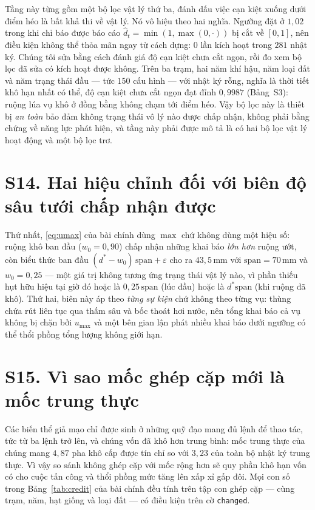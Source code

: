 Tầng này từng gồm một bộ lọc vật lý thứ ba, đánh dấu việc cạn kiệt xuống dưới điểm héo là
bất khả thi về vật lý. Nó vô hiệu theo hai nghĩa. Ngưỡng đặt ở $1{,}02$ trong khi chỉ báo
được báo cáo $\hat d_t=\min(1,\max(0,\cdot))$ bị cắt về $[0,1]$, nên điều kiện không thể
thỏa mãn ngay từ cách dựng: $0$ lần kích hoạt trong $281$ nhật ký. Chúng tôi sửa bằng cách
đánh giá độ cạn kiệt chưa cắt ngọn, rồi đo xem bộ lọc đã sửa có kích hoạt được không. Trên
ba trạm, hai năm khí hậu, năm loại đất và năm trạng thái đầu --- tức $150$ cấu hình --- với
nhật ký rỗng, nghĩa là thời tiết khô hạn nhất có thể, độ cạn kiệt chưa cắt ngọn đạt đỉnh
$0{,}9987$ (Bảng~S3): ruộng lúa vụ khô ở đồng bằng không chạm tới điểm héo. Vậy bộ lọc này
là thiết bị \emph{an toàn} bảo đảm không trạng thái vô lý nào được chấp nhận, không phải
bằng chứng về năng lực phát hiện, và tầng này phải được mô tả là có hai bộ lọc vật lý hoạt
động và một bộ lọc trơ.

\section*{S14. Hai hiệu chỉnh đối với biên độ sâu tưới chấp nhận được}

Thứ nhất, \eqref{eq:umax} của bài chính dùng $\max$ chứ không dùng một hiệu số: ruộng khô ban
đầu ($w_0=0{,}90$) chấp nhận những khai báo \emph{lớn hơn} ruộng ướt, còn biểu thức ban đầu
$(d^{*}-w_0)\,\mathrm{span}+\varepsilon$ cho ra $43{,}5$\,mm với $\mathrm{span}=70$\,mm và
$w_0=0{,}25$ --- một giá trị không tương ứng trạng thái vật lý nào, vì phần thiếu hụt hữu hiệu
tại giờ đó hoặc là $0{,}25\,\mathrm{span}$ (lúc đầu) hoặc là $d^{*}\mathrm{span}$ (khi ruộng đã
khô). Thứ hai, biên này áp theo \emph{từng sự kiện} chứ không theo từng vụ: thùng chứa rút
liên tục qua thấm sâu và bốc thoát hơi nước, nên tổng khai báo cả vụ không bị chặn bởi
$u_{\max}$ và một bên gian lận phát nhiều khai báo dưới ngưỡng có thể thổi phồng tổng lượng không
giới hạn.

\section*{S15. Vì sao mốc ghép cặp mới là mốc trung thực}

Các biến thể giả mạo chỉ được sinh ở những quỹ đạo mang đủ lệnh để thao tác, tức từ ba lệnh
trở lên, và chúng vốn đã khô hơn trung bình: mốc trung thực của chúng mang $4{,}87$ pha khô
cấp được tín chỉ so với $3{,}23$ của toàn bộ nhật ký trung thực. Vì vậy so sánh không ghép cặp
với mốc rộng hơn sẽ quy phần khô hạn vốn có cho cuộc tấn công và thổi phồng mức tăng lên xấp xỉ
gấp đôi. Mọi con số trong Bảng~\ref{tab:credit} của bài chính đều tính trên tập con ghép cặp
--- cùng trạm, năm, hạt giống và loại đất --- có điều kiện trên cờ \texttt{changed}.


